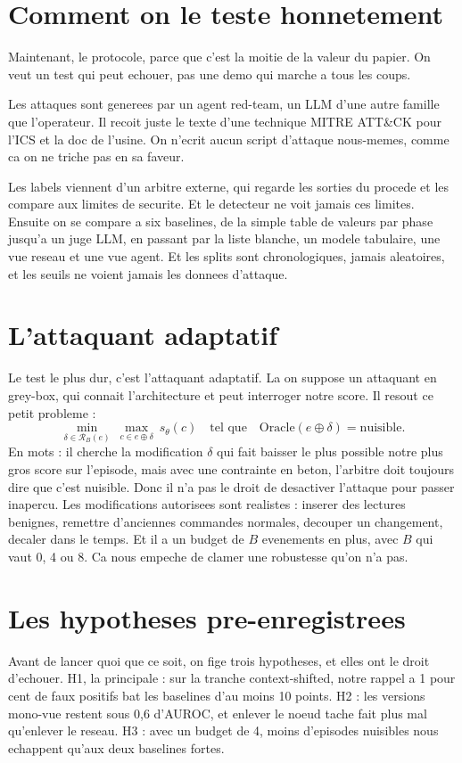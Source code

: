 \documentclass[11pt]{article}
\begin{document}
\section{Comment on le teste honnetement}
Maintenant, le protocole, parce que c'est la moitie de la valeur du papier. On veut
un test qui peut echouer, pas une demo qui marche a tous les coups.

Les attaques sont generees par un agent red-team, un LLM d'une autre famille que
l'operateur. Il recoit juste le texte d'une technique MITRE ATT\&CK pour l'ICS et la
doc de l'usine. On n'ecrit aucun script d'attaque nous-memes, comme ca on ne triche
pas en sa faveur.

Les labels viennent d'un arbitre externe, qui regarde les sorties du procede et les
compare aux limites de securite. Et le detecteur ne voit jamais ces limites. Ensuite
on se compare a six baselines, de la simple table de valeurs par phase jusqu'a un
juge LLM, en passant par la liste blanche, un modele tabulaire, une vue reseau et
une vue agent. Et les splits sont chronologiques, jamais aleatoires, et les seuils
ne voient jamais les donnees d'attaque.

\section{L'attaquant adaptatif}
Le test le plus dur, c'est l'attaquant adaptatif. La on suppose un attaquant en
grey-box, qui connait l'architecture et peut interroger notre score. Il resout ce
petit probleme :
\[
  \min_{\delta\in\mathcal{R}_B(e)}\ \max_{c\in e\oplus\delta}\ s_\theta(c)
  \quad\text{tel que}\quad \mathrm{Oracle}(e\oplus\delta) = \text{nuisible}.
\]
En mots : il cherche la modification \(\delta\) qui fait baisser le plus possible
notre plus gros score sur l'episode, mais avec une contrainte en beton, l'arbitre
doit toujours dire que c'est nuisible. Donc il n'a pas le droit de desactiver
l'attaque pour passer inapercu. Les modifications autorisees sont realistes :
inserer des lectures benignes, remettre d'anciennes commandes normales, decouper un
changement, decaler dans le temps. Et il a un budget de \(B\) evenements en plus,
avec \(B\) qui vaut 0, 4 ou 8. Ca nous empeche de clamer une robustesse qu'on n'a
pas.

\section{Les hypotheses pre-enregistrees}
Avant de lancer quoi que ce soit, on fige trois hypotheses, et elles ont le droit
d'echouer. H1, la principale : sur la tranche context-shifted, notre rappel a 1 pour
cent de faux positifs bat les baselines d'au moins 10 points. H2 : les versions mono-vue
restent sous 0,6 d'AUROC, et enlever le noeud tache fait plus mal qu'enlever le
reseau. H3 : avec un budget de 4, moins d'episodes nuisibles nous echappent qu'aux
deux baselines fortes.
\end{document}
